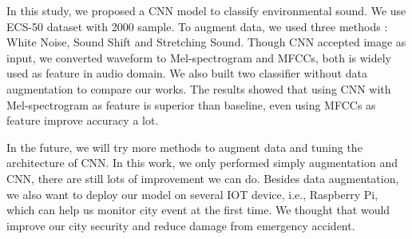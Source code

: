 In this study, we proposed a CNN model to classify environmental sound. We use ECS-50 dataset with 2000 sample. 
To augment data, we used three methods : White Noise, Sound Shift and Stretching Sound. 
Though CNN accepted image as input, we converted waveform to Mel-spectrogram and MFCCs, both is widely used as feature in audio domain. 
We also built two classifier without data augmentation to compare our works. 
The results showed that using CNN with Mel-spectrogram as feature is superior than baseline, even using MFCCs as feature improve accuracy a lot. 

In the future, we will try more methods to augment data and tuning the architecture of CNN. In this work, we only performed simply augmentation and CNN, there are still lots of improvement we can do. Besides data augmentation, we also want to deploy our model on several IOT device, i.e., Raspberry Pi, which can help us monitor city event at the first time. We thought that would improve our city security and reduce damage from emergency accident.
